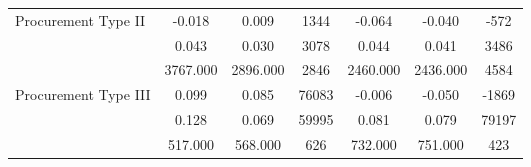 \begin{table}[!htbp]
\begin{tabular}{lcccccc}
  Procurement Type II & -0.018 & 0.009 & 1344 & -0.064 & -0.040 & -572 \\ 
    & 0.043 & 0.030 & 3078 & 0.044 & 0.041 & 3486 \\ 
    & 3767.000 & 2896.000 & 2846 & 2460.000 & 2436.000 & 4584 \\ 
  Procurement Type III & 0.099 & 0.085 & 76083 & -0.006 & -0.050 & -1869 \\ 
    & 0.128 & 0.069 & 59995 & 0.081 & 0.079 & 79197 \\ 
    & 517.000 & 568.000 & 626 & 732.000 & 751.000 & 423 \\ 
   \hline
\hline
\end{tabular}
\endgroup
\end{table}
